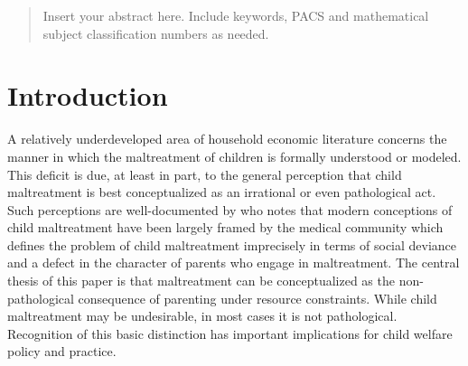 
\date{Received: date / Accepted: date}


\maketitle

\begin{abstract}
Insert your abstract here. Include keywords, PACS and mathematical
subject classification numbers as needed.
\end{abstract}

\section{Introduction}
\label{intro}
A relatively underdeveloped area of household economic literature concerns the manner in which the maltreatment of children is formally understood or modeled. This deficit is due, at least in part, to the general perception that child maltreatment is best conceptualized as an irrational or even pathological act. Such perceptions are well-documented by \citet{Nelson1986} who notes that modern conceptions of child maltreatment have been largely framed by the medical community which defines the problem of child maltreatment imprecisely in terms of social deviance and a defect in the character of parents who engage in maltreatment. The central thesis of this paper is that maltreatment can be conceptualized as the non-pathological consequence of parenting under resource constraints. While child maltreatment may be undesirable, in most cases it is not pathological. Recognition of this basic distinction has important implications for child welfare policy and practice.

